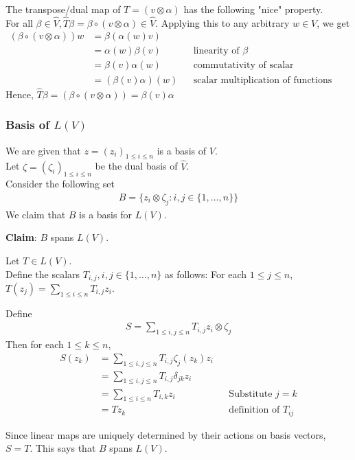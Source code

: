 \documentclass{article}
\begin{document}
The transpose/dual map of $T=(v\otimes \alpha)$ has the following "nice" property. \\
For all $\beta \in \hat{V}, \hat{T}\beta=\beta \circ (v\otimes \alpha)\in \hat{V}$. Applying this to any arbitrary $w\in V$, we get 
\begin{align*}
	(\beta \circ (v\otimes \alpha))w&=\beta(\alpha(w)v)\\
	&=\alpha(w)\beta(v) && \text{linearity of $\beta$}\\
	&=\beta(v)\alpha(w) && \text{commutativity of scalar multiplication}\\
	&=(\beta(v)\alpha)(w) && \text{scalar multiplication of functions}
\end{align*}
Hence, $\hat{T}\beta=(\beta \circ (v\otimes \alpha))=\beta(v)\alpha$

\subsubsection{Basis of $L(V)$}
We are given that $z=(z_i)_{1\leq i\leq n}$ is a basis of $V$.\\
Let $\zeta=(\zeta_i)_{1\leq i\leq n}$ be the dual basis of $\hat{V}$.\\
Consider the following set 
\begin{align*}
	B=\{z_i\otimes \zeta_j : i,j\in \{1,\dots, n\}\}
\end{align*}
We claim that $B$ is a basis for $L(V)$.

\textbf{Claim}: $B$ spans $L(V)$.

Let $T\in L(V)$.\\
Define the scalars $T_{i,j}, i,j\in \{1,\dots,n\}$ as follows: For each $1\leq j\leq n$, $T(z_j)=\sum_{1\leq i\leq n}T_{i,j}z_i$.

Define 
\begin{align*}
	S=\sum_{1\leq i,j\leq n}T_{i,j}z_i \otimes \zeta_j
\end{align*}
Then for each $1\leq k\leq n$, 
\begin{align*}
	S(z_k)&=\sum_{1\leq i,j\leq n}T_{i,j}\zeta_j(z_k)z_i \\
	&=\sum_{1\leq i,j\leq n}T_{i,j}\delta_{jk}z_i\\
	&=\sum_{1\leq i\leq n}T_{i,k}z_i && \text{Substitute $j=k$}\\
	&=Tz_k && \text{definition of $T_{ij}$}
\end{align*}

Since linear maps are uniquely determined by their actions on basis vectors, $S=T$. This says that $B$ spans $L(V)$.
\end{document}
